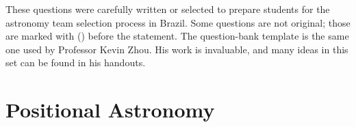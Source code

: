 \documentclass[11pt]{article}
\begin{document}

These questions were carefully written or selected to prepare students for the astronomy team selection process in Brazil. Some questions are not original; those are marked with () before the statement. The question-bank template is the same one used by Professor Kevin Zhou. His work is invaluable, and many ideas in this set can be found in his handouts.




\section{Positional Astronomy}
\end{document}
